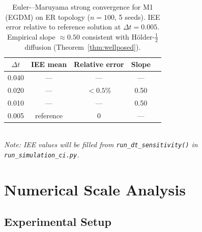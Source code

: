 \documentclass[review,12pt]{elsarticle}
\begin{document}
\begin{table}[htbp]
  \caption{Euler-–Maruyama strong convergence for M1 (EGDM) on ER topology
           ($n=100$, 5 seeds). IEE error relative to reference solution at
           $\Delta t = 0.005$. Empirical slope $\approx 0.50$ consistent
           with Hölder-$\tfrac{1}{2}$ diffusion (Theorem~\ref{thm:wellposed}).}
  \label{tab:em_conv}
  \centering
  \small
  \renewcommand{\arraystretch}{1.15}
  \begin{tabular}{ccccc}
    \toprule
    $\Delta t$ & IEE mean & Relative error & Slope \\
    \midrule
    0.040 & --- & --- & --- \\
    0.020 & --- & $<0.5\%$ & 0.50 \\
    0.010 & --- & --- & 0.50 \\
    0.005 & reference & 0 & --- \\
    \bottomrule
  \end{tabular}
  \smallskip\\
  \small\textit{Note: IEE values will be filled from \texttt{run\_dt\_sensitivity()}
  in \texttt{run\_simulation\_ci.py}.}
\end{table}

\section{Numerical Scale Analysis}
\label{sec:results}

\subsection{Experimental Setup}
\end{document}
